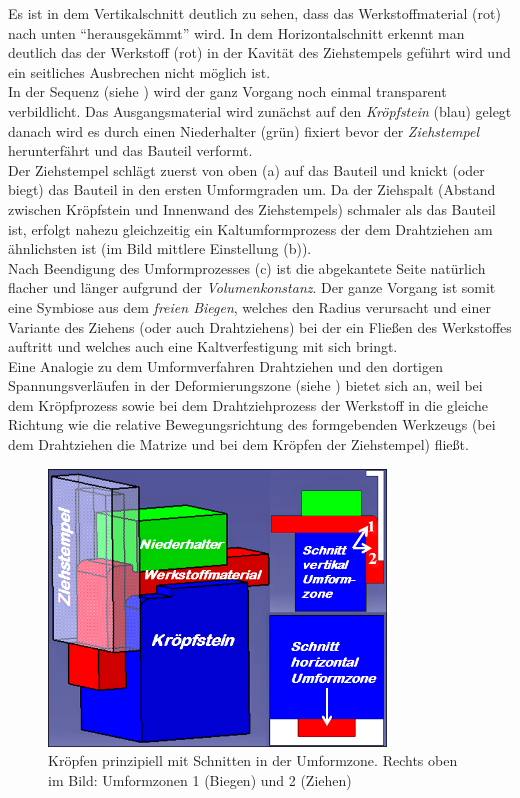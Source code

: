 \documentclass[12pt,a4paper,parskip]{scrartcl}
\begin{document}
 Es ist in dem Vertikalschnitt deutlich zu sehen, dass das Werkstoffmaterial (rot) nach unten "`herausgekämmt"' wird. In dem Horizontalschnitt erkennt man deutlich das der Werkstoff (rot) in der Kavität des Ziehstempels geführt wird und ein seitliches Ausbrechen nicht möglich ist.\\ In der Sequenz (siehe ) wird der ganz Vorgang noch einmal transparent verbildlicht. Das Ausgangsmaterial wird zunächst auf den \emph{Kröpfstein} (blau) gelegt danach wird es durch einen Niederhalter (grün) fixiert bevor der \emph{Ziehstempel} herunterfährt und das Bauteil verformt. \\    Der Ziehstempel schlägt zuerst von oben  (a) auf das Bauteil  und knickt (oder biegt) das Bauteil in den ersten Umformgraden um. Da der Ziehspalt (Abstand zwischen Kröpfstein und Innenwand des Ziehstempels) schmaler als das Bauteil ist, erfolgt nahezu gleichzeitig  ein Kaltumformprozess der dem Drahtziehen am ähnlichsten ist (im Bild mittlere Einstellung (b)). \\ Nach Beendigung des Umformprozesses (c) ist die abgekantete Seite natürlich flacher und länger aufgrund der \emph{Volumenkonstanz}. Der ganze Vorgang ist somit eine Symbiose aus dem \emph{freien Biegen}, welches den Radius verursacht und einer Variante des Ziehens (oder auch Drahtziehens) bei der ein Fließen des Werkstoffes auftritt und welches auch eine Kaltverfestigung mit sich bringt. \\
Eine Analogie zu dem Umformverfahren Drahtziehen und den dortigen Spannungsverläufen in der Deformierungszone (siehe ) bietet sich an, weil bei dem Kröpfprozess sowie bei dem Drahtziehprozess der Werkstoff in die gleiche Richtung wie die relative Bewegungsrichtung des  formgebenden Werkzeugs (bei dem Drahtziehen die Matrize und bei dem Kröpfen der Ziehstempel) fließt.\\
\begin{figure}[hbtp]
\centering
\includegraphics[width=0.8\textwidth]{krpfgesamt.png}
\caption{Kröpfen prinzipiell mit Schnitten in der Umformzone. Rechts oben im Bild: Umformzonen 1 (Biegen) und 2 (Ziehen)}
\label{fig:krpfgesamt}
\end{figure}
\end{document}

